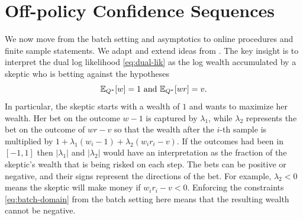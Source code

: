 \section{Off-policy Confidence Sequences}
We now move from the batch setting and asymptotics to
online procedures and finite sample statements.
We adapt and extend ideas from \cite{waudby-smith_variance-adaptive_2020}.
The key insight is to interpret the 
dual log likelihood \eqref{eq:dual-lik}
as the log wealth accumulated by a skeptic who is betting against the
hypotheses 
\[
\mathbb{E}_{Q^*}[w]=1 \text{ and } \mathbb{E}_{Q^*}[wr]=v.
\]
In particular,
the skeptic starts with a wealth of $1$ and wants to 
maximize her wealth. Her bet on the outcome $w-1$ is captured by $\lambda_1$, while $\lambda_2$
represents the bet on the outcome of $wr-v$ so that the wealth after
the $i$-th sample is multiplied by $1+\lambda_1(w_i-1)+\lambda_2 (w_i r_i -v)$. If the outcomes had been in $[-1,1]$ then
$|\lambda_1|$ and $|\lambda_2|$ would have an interpretation as 
the fraction of the skeptic's wealth that is being risked 
on each step. The bets can be positive
or negative, and their signs represent the directions of the bet. For example, $\lambda_2<0$ means 
the skeptic will make money if $w_ir_i-v<0$.
Enforcing the constraints 
\eqref{eq:batch-domain}
from the batch setting here means that 
the resulting wealth cannot be negative.



